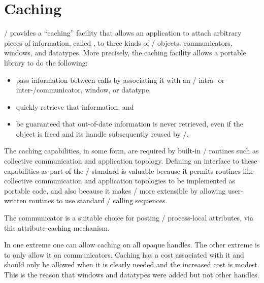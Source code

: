 \section{Caching} 
\label{sec:caching}

\MPI/ provides a ``caching'' facility that allows an application to
attach arbitrary pieces of information, called , to
three kinds of \MPI/ objects: communicators,
windows, and datatypes.
More precisely, the caching
facility allows a portable library to do the following:
\begin{itemize}
\item
  pass information between calls by associating it
  with an \MPI/ intra- or inter\hyphen/communicator,
window, or datatype,
\item quickly retrieve that information, and
\item
 be guaranteed that out-of-date information is never retrieved, even if
 the object is freed and its handle subsequently reused by \MPI/.
\end{itemize}

The caching capabilities, in some form, are required by built-in \MPI/ routines
such as collective communication and application topology. Defining an
interface to these capabilities as part of the \MPI/ standard is valuable
because it permits routines like collective communication and application
topologies to be implemented as portable code, and also because it makes \MPI/
more extensible by allowing user-written routines to use standard \MPI/ calling
sequences.

\begin{users}
The communicator  is a suitable choice for posting
\MPI/ process-local attributes, via this
attribute-caching mechanism.
\end{users}


\begin{rationale}
In one extreme 
one
can allow caching on all opaque handles. The other
extreme is to only allow it on communicators. Caching has a cost
associated with it and should only be allowed when it is clearly needed and
the increased cost is modest.
This is the reason that windows and datatypes were
added but not other handles.
\end{rationale}

